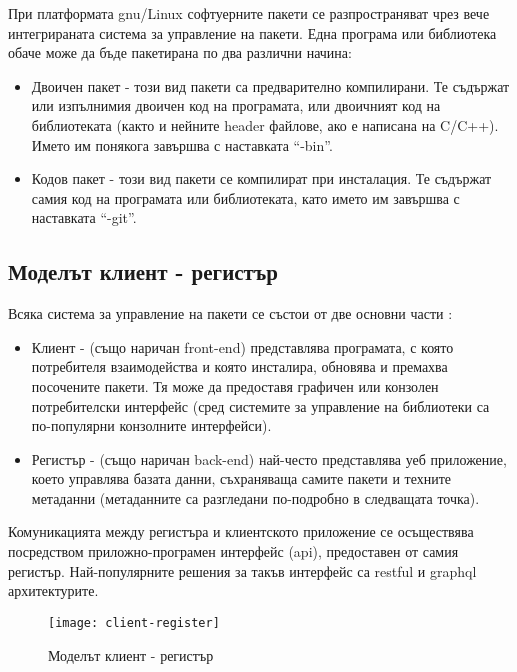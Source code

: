 При платформата \acrshort{gnu}/Linux софтуерните пакети се разпространяват чрез
вече интегрираната система за управление на пакети. Една програма или библиотека
обаче може да бъде пакетирана по два различни начина:

\begin{itemize}
    \item Двоичен пакет - този вид пакети са предварително компилирани. Те
          съдържат или изпълнимия двоичен код на програмата, или двоичният код
          на библиотеката (както и нейните header файлове, ако е написана на
          C/C++). Името им понякога завършва с наставката ``-bin''.
    \item Кодов пакет - този вид пакети се компилират при инсталация. Те
          съдържат самия код на програмата или библиотеката, като името им
          завършва с наставката ``-git''.
\end{itemize}


\subsection{Моделът клиент - регистър}

Всяка система за управление на пакети се състои от две основни части
:

\begin{itemize}
    \item Клиент - (също наричан front-end) представлява програмата, с която
          потребителя взаимодейства и която инсталира, обновява и премахва
          посочените пакети. Тя може да предоставя графичен или конзолен
          потребителски интерфейс (сред системите за управление на библиотеки са
          по-популярни конзолните интерфейси).
    \item Регистър - (също наричан back-end) най-често представлява уеб
          приложение, което управлява базата данни, съхраняваща самите пакети и
          техните метаданни (метаданните са разгледани по-подробно в следващата
          точка).
\end{itemize}

Комуникацията между регистъра и клиентското приложение се осъществява
посредством приложно-програмен интерфейс (\acrshort{api}), предоставен от самия
регистър. Най-популярните решения за такъв интерфейс са \acrshort{rest}ful и
\acrshort{graphql} архитектурите.

\begin{figure}[h]
    \centering
    \texttt{[image: client-register]}
    \caption{Моделът клиент - регистър}
    \label{fig:client-register}
\end{figure}


